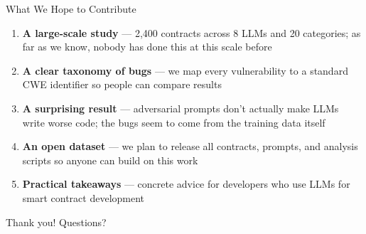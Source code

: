 \documentclass[aspectratio=169]{beamer}
\begin{document}
\begin{frame}{What We Hope to Contribute}
\begin{enumerate}
    \item \textbf{A large-scale study} --- 2,400 contracts across 8 LLMs and 20 categories; as far as we know, nobody has done this at this scale before
    \vspace{0.3cm}
    \item \textbf{A clear taxonomy of bugs} --- we map every vulnerability to a standard CWE identifier so people can compare results
    \vspace{0.3cm}
    \item \textbf{A surprising result} --- adversarial prompts don't actually make LLMs write worse code; the bugs seem to come from the training data itself
    \vspace{0.3cm}
    \item \textbf{An open dataset} --- we plan to release all contracts, prompts, and analysis scripts so anyone can build on this work
    \vspace{0.3cm}
    \item \textbf{Practical takeaways} --- concrete advice for developers who use LLMs for smart contract development
\end{enumerate}

\vspace{0.5cm}
\centering
\large Thank you! Questions?
\end{frame}
\end{document}
